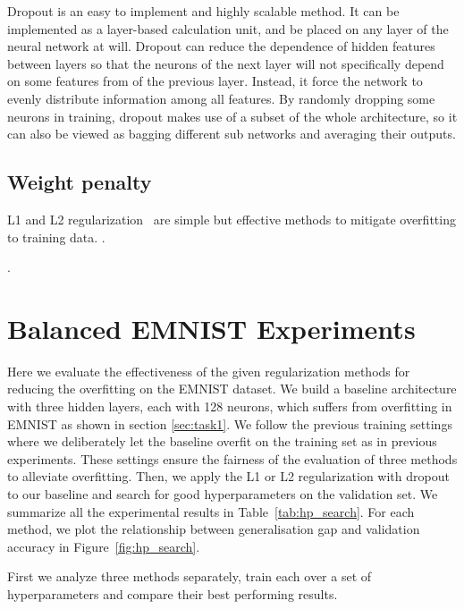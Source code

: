 \documentclass{article}
\begin{document}
Dropout is an easy to implement and highly scalable
method. It can be implemented as a layer-based calculation
unit, and be placed on any layer of the neural network at
will. Dropout can reduce the dependence of hidden features
between layers so that the neurons of the next layer will not
specifically depend on some features from of the previous layer.
Instead, it force the network to evenly distribute information
among all features. By randomly dropping some neurons in training,
dropout makes use of a subset of the whole architecture, so it can 
also be viewed as bagging different sub networks and averaging their
outputs.



\subsection{Weight penalty}

L1 and L2 regularization~\cite{ng2004feature} are simple but effective
methods to mitigate overfitting to training data.
\questionThirteen.

\questionFourteen.



\section{Balanced EMNIST Experiments}

\questionTableThree

\questionFigureFour

\label{sec:task2.2}

Here we evaluate the effectiveness of the given regularization methods for reducing the overfitting on the EMNIST dataset.
We build a baseline architecture with three hidden layers, each with 128 neurons, which suffers from overfitting in EMNIST as shown in section \ref{sec:task1}.
We follow the previous training settings where we deliberately let the baseline overfit
on the training set as in previous experiments. 
These settings ensure the fairness of the evaluation of three methods to alleviate overfitting. 
Then, we apply the L1 or L2 regularization with dropout to our baseline and search for good hyperparameters on the validation set. 
We summarize all
the experimental results in Table~\ref{tab:hp_search}. For each method, we
plot the relationship between generalisation gap and validation accuracy in Figure~\ref{fig:hp_search}.

First we analyze three methods separately, train each over a set of hyperparameters and compare their best performing results.
\end{document}
